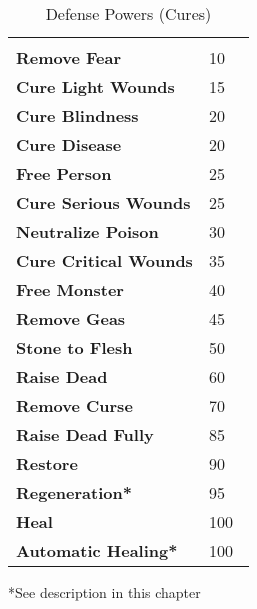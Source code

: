 \begin{multicols*}{2}
\begin {table}[H]
  \caption{Defense Powers (Cures)}
  \begin{tabularx}{\columnwidth}{>{\bfseries}YY}
   & \\
	Remove Fear & 10\\
	Cure Light Wounds & 15\\
	Cure Blindness & 20\\
	Cure Disease & 20\\
	Free Person & 25\\
	Cure Serious Wounds & 25\\
	Neutralize Poison & 30\\
	Cure Critical Wounds & 35\\
	Free Monster & 40\\
	Remove Geas & 45\\
	Stone to Flesh & 50\\
	Raise Dead & 60\\
	Remove Curse & 70\\
	Raise Dead Fully & 85\\
	Restore & 90\\
	Regeneration* & 95\\
	Heal & 100\\
	Automatic Healing* & 100\
  \end {tabularx}
	*See description in this chapter
\end {table}


\end{multicols*}
